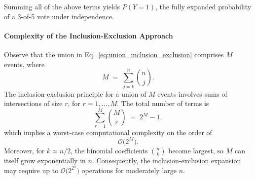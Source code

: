Summing all of the above terms yields \(P(Y=1)\), the fully expanded probability of a 3-of-5 vote under independence.

\paragraph{Complexity of the Inclusion-Exclusion Approach}
Observe that the union in Eq.~\eqref{eq:union_inclusion_exclusion} comprises \(M\) events, where
\[
M \;=\;\sum_{j=k}^{n} \binom{n}{j}.
\]
The inclusion-exclusion principle for a union of \(M\) events involves sums of intersections of size \(r\), for \(r=1,\dots,M\). The total number of terms is
\[
\sum_{r=1}^{M} \binom{M}{r}
\;=\;
2^{M}-1,
\]
which implies a worst-case computational complexity on the order of
\[
\mathcal{O}\bigl(2^{M}\bigr).
\]
Moreover, for \(k\approx n/2\), the binomial coefficients \(\binom{n}{k}\) become largest, so \(M\) can itself grow exponentially in \(n\). Consequently, the inclusion-exclusion expansion may require up to \(\mathcal{O}\bigl(2^{2^{n}}\bigr)\) operations for moderately large \(n\).
